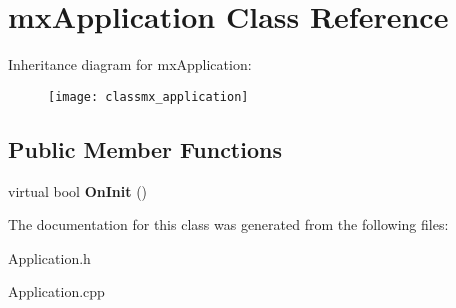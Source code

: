 \hypertarget{classmx_application}{}\section{mx\+Application Class Reference}
\label{classmx_application}
Inheritance diagram for mx\+Application\+:\begin{figure}[H]
\begin{center}
\leavevmode
\texttt{[image: classmx\_application]}
\end{center}
\end{figure}
\subsection*{Public Member Functions}
\begin{DoxyCompactItemize}
\item 
virtual bool {\bfseries On\+Init} ()\hypertarget{classmx_application_a3a3ff4642a63412257a08846ba957834}{}\label{classmx_application_a3a3ff4642a63412257a08846ba957834}

\end{DoxyCompactItemize}


The documentation for this class was generated from the following files\+:\begin{DoxyCompactItemize}
\item 
Application.\+h\item 
Application.\+cpp\end{DoxyCompactItemize}
